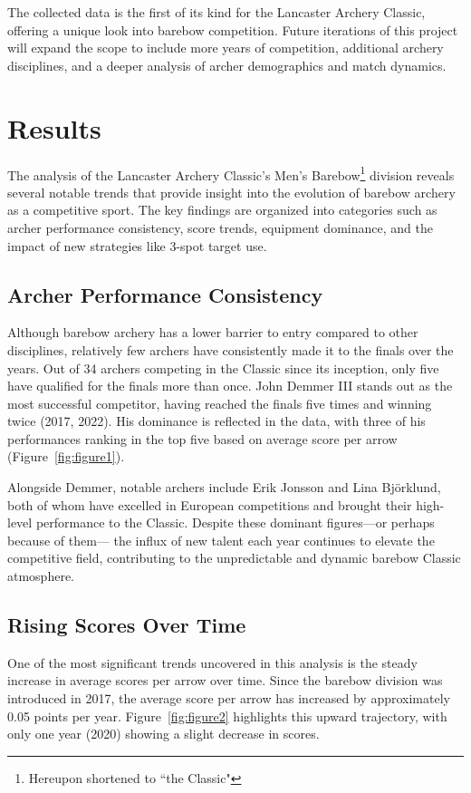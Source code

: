 \documentclass{article}
\begin{document}
The collected data is the first of its kind for the Lancaster Archery Classic, offering a unique look into barebow competition. Future iterations of this project will expand the scope to include more years of competition, additional archery disciplines, and a deeper analysis of archer demographics and match dynamics.

\section{Results}
The analysis of the Lancaster Archery Classic's Men's Barebow\footnote{Hereupon shortened to ``the Classic"} division reveals several notable trends that provide insight into the evolution of barebow archery as a competitive sport. The key findings are organized into categories such as archer performance consistency, score trends, equipment dominance, and the impact of new strategies like 3-spot target use.

\subsection{Archer Performance Consistency}
Although barebow archery has a lower barrier to entry compared to other disciplines, relatively few archers have consistently made it to the finals over the years. Out of 34 archers competing in the Classic since its inception, only five have qualified for the finals more than once. John Demmer III stands out as the most successful competitor, having reached the finals five times and winning twice (2017, 2022). His dominance is reflected in the data, with three of his performances ranking in the top five based on average score per arrow (Figure~\ref{fig:figure1}).

Alongside Demmer, notable archers include Erik Jonsson and Lina Björklund, both of whom have excelled in European competitions and brought their high-level performance to the Classic. Despite these dominant figures—or perhaps because of them— the influx of new talent each year continues to elevate the competitive field, contributing to the unpredictable and dynamic barebow Classic atmosphere.

\subsection{Rising Scores Over Time}
One of the most significant trends uncovered in this analysis is the steady increase in average scores per arrow over time. Since the barebow division was introduced in 2017, the average score per arrow has increased by approximately 0.05 points per year. Figure~\ref{fig:figure2} highlights this upward trajectory, with only one year (2020) showing a slight decrease in scores.
\end{document}
